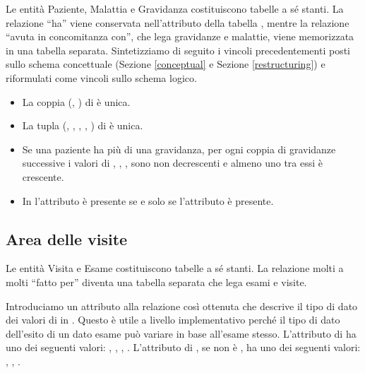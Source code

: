Le entità Paziente, Malattia e Gravidanza costituiscono tabelle a sé stanti.
La relazione \enquote{ha} viene conservata nell'attributo  della tabella , mentre la relazione \enquote{avuta in concomitanza con}, che lega gravidanze e malattie, viene memorizzata in una tabella separata.
Sintetizziamo di seguito i vincoli precedentementi posti sullo schema concettuale (Sezione \ref{conceptual} e Sezione \ref{restructuring}) e riformulati come vincoli sullo schema logico.
\begin{itemize}
\item[\Con{}] La coppia (, ) di  è unica.
\item[\Con{}] La tupla (, , , , ) di  è unica.
\item[\Con{}] Se una paziente ha più di una gravidanza, per ogni coppia di gravidanze successive i valori di , , ,  sono non decrescenti e almeno uno tra essi è crescente.
\item[\Con{}] In  l'attributo  è presente se e solo se l'attributo  è presente.
\end{itemize}

\subsection{Area delle visite}
\label{logicalvisits}

Le entità Visita e Esame costituiscono tabelle a sé stanti. La relazione molti a molti \enquote{fatto per} diventa una tabella separata che lega esami e visite.

Introduciamo un attributo  alla relazione  così ottenuta che descrive il tipo di dato dei valori di  in .
Questo è utile a livello implementativo perché il tipo di dato dell'esito di un dato esame può variare in base all'esame stesso.
L'attributo  di  ha uno dei seguenti valori: , , , .
L'attributo  di , se non è , ha uno dei seguenti valori: , , .

